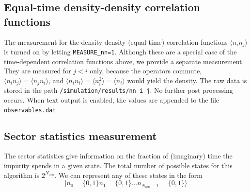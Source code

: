 \documentclass[aps,prb,floatfix,superscriptaddress,twocolumn,notitlepage]{revtex4-1}
\begin{document}
\subsection{Equal-time density-density correlation functions}

The measurement for the density-density (equal-time) correlation functions $\langle n_{i}n_{j}\rangle$ is turned on by letting \verb#MEASURE_nn=1#. Although these are a special case of the time-dependent correlation functions above, we provide a separate measurement.
They are measured for $j<i$ only, because the operators commute, $\langle n_{i}n_{j}\rangle=\langle n_{j}n_{i}\rangle$,  and $\langle n_{i}n_{i}\rangle = \langle n^{2}_{i}\rangle = \langle n_{i}\rangle$ would yield the density. The raw data is stored in the path \verb#/simulation/results/nn_i_j#. No further post processing occurs. When text output is enabled, the values are appended to the file \verb#observables.dat#.

\subsection{Sector statistics measurement}
The sector statistics give information on the fraction of (imaginary) time the impurity spends in a given state. The total number of possible states for this algorithm is $2^{N_{\text{orb}}}$. 
We can represent any of these states in the form
\begin{equation}
|n_{0}=\{0,1\} n_{1}=\{0,1\}\ldots n_{N_{\text{orb}}-1}=\{0,1\}\rangle
\end{equation}
\end{document}
